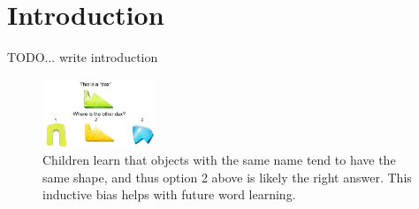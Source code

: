 \section{Introduction}

TODO... write introduction
\begin{figure}[h!]
    \begin{center}
        \includegraphics[width=0.3\textwidth]{figures/shape_bias_demo.pdf}
    \end{center}
    \caption{Children learn that objects with the same name tend to have the
    same shape, and thus option 2 above is likely the right answer. This
    inductive bias helps with future word learning.}
    \label{fig:shape_bias_demo}
\end{figure}

